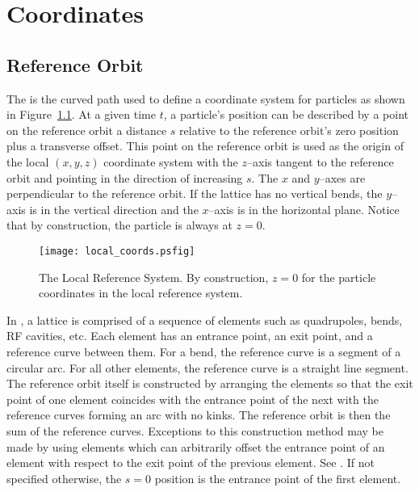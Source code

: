 \chapter{Coordinates}

\section{Reference Orbit}
\label{s:ref}

The  is the curved path used to define a coordinate
system for particles as shown in Figure~\ref{f:local_coords}.  At a
given time $t$, a particle's position can be described by a point on
the reference orbit a distance $s$ relative to the reference orbit's
zero position plus a transverse offset. This point on the reference
orbit is used as the origin of the local $(x, y, z)$ coordinate system
with the $z$--axis tangent to the reference orbit and pointing in the
direction of increasing $s$. The $x$ and $y$--axes are
perpendicular to the reference orbit. If the lattice has no vertical
bends, the $y$--axis is in the vertical direction and the $x$--axis is
in the horizontal plane. Notice that by construction, the particle is
always at $z = 0$.

\begin{figure}[tb]
\centering
\texttt{[image: local\_coords.psfig]}
\caption[The Local Reference System.]
{The Local Reference System. By construction, $z = 0$ for
the particle coordinates in the local reference system.}
\label{f:local_coords}
\end{figure}

In \bmad, a lattice is comprised of a sequence of elements such as
quadrupoles, bends, RF cavities, etc. Each element has an entrance
point, an exit point, and a reference curve between them. For a bend,
the reference curve is a segment of a circular arc. For all other
elements, the reference curve is a straight line segment. The
reference orbit itself is constructed by arranging the elements so
that the exit point of one element coincides with the entrance point
of the next with the reference curves forming an arc with no kinks.
The reference orbit is then the sum of the reference
curves. Exceptions to this construction method may be made by using
 elements which can arbitrarily offset the entrance point
of an element with respect to the exit point of the previous element.
See .  If not specified otherwise, the $s = 0$
position is the entrance point of the first element.

